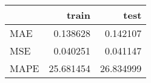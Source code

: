 \begin{tabular}{lrr}
\toprule
{} &      train &       test \\
\midrule
MAE  &   0.138628 &   0.142107 \\
MSE  &   0.040251 &   0.041147 \\
MAPE &  25.681454 &  26.834999 \\
\bottomrule
\end{tabular}
